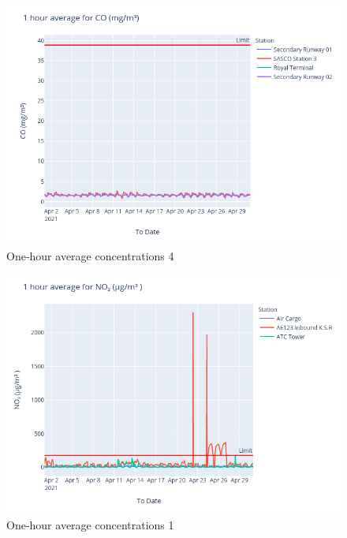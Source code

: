 \documentclass[12pt, oneside]{book}
\begin{document}
{
{\begin{figure}[H]
\centering
\includegraphics[width=\textwidth]{image218}
\caption{One-hour average  concentrations 4}\label{image218}
\end{figure}}{}

{\begin{figure}[H]
\centering
\includegraphics[width=\textwidth]{image183}
\caption{One-hour average  concentrations 1}\label{image183}
\end{figure}}{}

}
\end{document}
